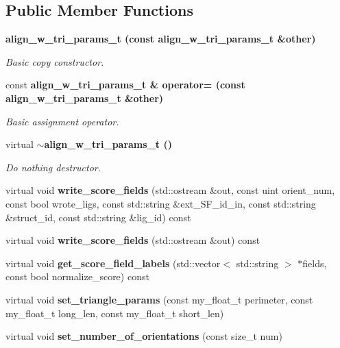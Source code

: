 \subsection*{Public Member Functions}
\begin{CompactItemize}
\item 
\bf{align\_\-w\_\-tri\_\-params\_\-t} (const \bf{align\_\-w\_\-tri\_\-params\_\-t} \&other)\label{classASCbase_1_1align__w__tri__params__t_483a34c589f7b8c6ed5ccb0207436910}

\begin{CompactList}\small\item\em Basic copy constructor. \item\end{CompactList}\item 
const \bf{align\_\-w\_\-tri\_\-params\_\-t} \& \bf{operator=} (const \bf{align\_\-w\_\-tri\_\-params\_\-t} \&other)\label{classASCbase_1_1align__w__tri__params__t_db03dafc141cf94fc2b71250a00b8fdf}

\begin{CompactList}\small\item\em Basic assignment operator. \item\end{CompactList}\item 
virtual \bf{$\sim$align\_\-w\_\-tri\_\-params\_\-t} ()\label{classASCbase_1_1align__w__tri__params__t_09024ddae3c35629a39ffa0a20a50e66}

\begin{CompactList}\small\item\em Do nothing destructor. \item\end{CompactList}\item 
virtual void \textbf{write\_\-score\_\-fields} (std::ostream \&out, const uint orient\_\-num, const bool wrote\_\-ligs, const std::string \&ext\_\-SF\_\-id\_\-in, const std::string \&struct\_\-id, const std::string \&lig\_\-id) const \label{classASCbase_1_1align__w__tri__params__t_194cd244292abd6ce90cfc4f0164bcb1}

\item 
virtual void \textbf{write\_\-score\_\-fields} (std::ostream \&out) const \label{classASCbase_1_1align__w__tri__params__t_b7e7cb9ab0bf1e0a10801ec8667026cc}

\item 
virtual void \textbf{get\_\-score\_\-field\_\-labels} (std::vector$<$ std::string $>$ $\ast$fields, const bool normalize\_\-score) const \label{classASCbase_1_1align__w__tri__params__t_5f779560ad2881c71dc876a58df96763}

\item 
virtual void \textbf{set\_\-triangle\_\-params} (const my\_\-float\_\-t perimeter, const my\_\-float\_\-t long\_\-len, const my\_\-float\_\-t short\_\-len)\label{classASCbase_1_1align__w__tri__params__t_067127f641ca7407b5eb01900d0c8ec8}

\item 
virtual void \textbf{set\_\-number\_\-of\_\-orientations} (const size\_\-t num)\label{classASCbase_1_1align__w__tri__params__t_f9c57b30b02ee6202689c3a5083b47a6}

\end{CompactItemize}
